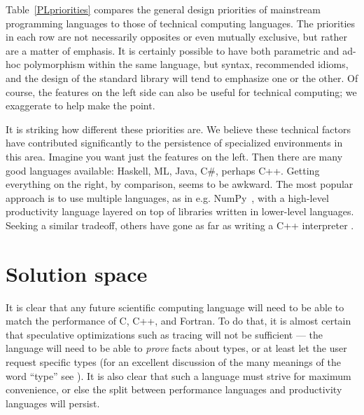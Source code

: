 Table~\ref{PLpriorities} compares the general design priorities of mainstream
programming languages to those of technical computing languages.
The priorities in each row are not necessarily opposites or even mutually exclusive,
but rather are a matter of emphasis.
It is certainly possible to have both parametric and ad-hoc polymorphism within
the same language, but syntax, recommended idioms, and the design of the standard
library will tend to emphasize one or the other.
Of course, the features on the left side can also be useful for technical computing;
we exaggerate to help make the point.

It is striking how different these priorities are.
We believe these technical factors have contributed significantly to the persistence
of specialized environments in this area.
Imagine you want just the features on the left.
Then there are many good languages available: Haskell, ML, Java, C\#, perhaps C++.
Getting everything on the right, by comparison, seems to be awkward.
The most popular approach is to use multiple languages, as in e.g. NumPy~\cite{numpy},
with a high-level productivity language layered on top of libraries
written in lower-level languages.
Seeking a similar tradeoff, others have gone as far as writing a C++
interpreter \cite{vasilev2012cling}.




\section{Solution space}

It is clear that any future scientific computing language will need to be able to
match the performance of C, C++, and Fortran.
To do that, it is almost certain that speculative optimizations such as tracing
\cite{tracingjit} will not be sufficient ---
the language will need to be able to \emph{prove} facts about types, or at least
let the user request specific types
(for an excellent discussion of the many meanings of the word ``type''
see \cite{Kell2014}).
It is also clear that such a language must strive for maximum convenience, or else
the split between performance languages and productivity languages will persist.

